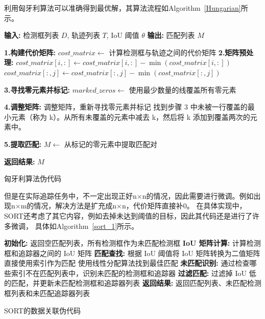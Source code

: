 利用匈牙利算法可以准确得到最优解，其算法流程如Algorithm\ \ref{Hungarian}所示。

\begin{algorithm}[H]
	\begin{algorithmic}
		\State \textbf{输入:} 检测框列表 $D$, 轨迹列表 $T$, IoU 阈值 $\theta$
		\State \textbf{输出:} 匹配列表 $M$
		
		\State \textbf{1.构建代价矩阵:}
		\State $cost\_matrix \leftarrow$ 计算检测框与轨迹之间的代价矩阵
		\State \textbf{2.矩阵预处理:}
		\State $cost\_matrix[i, :] \leftarrow cost\_matrix[i, :] - \min(cost\_matrix[i, :])$
		\EndFor
		\State $cost\_matrix[:, j] \leftarrow cost\_matrix[:, j] - \min(cost\_matrix[:, j])$
		\EndFor
		
		\State \textbf{3.寻找零元素并标记:}
		\State $marked\_zeros \leftarrow$ 使用最少数量的线覆盖所有零元素
		
		\State \textbf{4.调整矩阵:}
		\State 调整矩阵，重新寻找零元素并标记
		\State 找到步骤 3 中未被一行覆盖的最小元素（称为 k）。从所有未覆盖的元素中减去 k，然后将 k 添加到覆盖两次的元素中。
		\EndWhile
		
		\State \textbf{5.提取匹配:}
		\State $M \leftarrow$ 从标记的零元素中提取匹配对
		
		\State \textbf{返回结果:}
		\Return $M$
	\end{algorithmic}
	\caption{匈牙利算法伪代码}
	\label{Hungarian}
\end{algorithm}

但是在实际追踪任务中，不一定出现正好n×n的情况，因此需要进行微调。例如出现n×m的情况，解决方法是扩充成n×n，代价矩阵直接补0。
在具体实现中，SORT还考虑了其它内容，例如去掉未达到阈值的目标，因此其代码还是进行了许多微调，
具体如Algorithm\ \ref{sort_1}所示。

\begin{algorithm}[H]
	\begin{algorithmic}
		\State \textbf{初始化:}
		\If{追踪器列表为空}
		\State 返回空匹配列表，所有检测框作为未匹配检测框
		\EndIf
		\State \textbf{IoU 矩阵计算:}
		\State 计算检测框和追踪器之间的 IoU 矩阵
		\State \textbf{匹配查找:}
		\State 根据 IoU 阈值将 IoU 矩阵转换为二值矩阵
		\If{存在一一对应关系}
		\State 直接使用索引作为匹配
		\Else
		\State 使用线性分配算法找到最佳匹配
		\EndIf
		\State \textbf{未匹配识别:}
		\State 通过检查哪些索引不在匹配列表中，识别未匹配的检测框和追踪器
		\State \textbf{过滤匹配:}
		\State 过滤掉 IoU 低的匹配，并更新未匹配检测框和追踪器列表
		\State \textbf{返回结果:}
		\State 返回匹配列表、未匹配检测框列表和未匹配追踪器列表
	\end{algorithmic}
	\caption{SORT的数据关联伪代码}
	\label{sort_1}
\end{algorithm}

